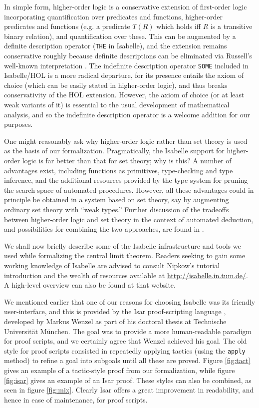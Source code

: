 \documentclass[leqno]{article}
\theoremstyle{definition}
\begin{document}
In simple form, higher-order logic is a conservative extension of first-order logic incorporating quantification over predicates and functions, higher-order predicates and functions (e.g. a predicate $T(R)$ which holds iff $R$ is a transitive binary relation), and quantification over these. This can be augmented by a definite description operator (\texttt{THE} in Isabelle), and the extension remains conservative roughly because definite descriptions can be eliminated via Russell's well-known interpretation \cite{russell-knowledge-acquaintance-description}. The indefinite description operator \texttt{SOME} included in Isabelle/HOL is a more radical departure, for its presence entails the axiom of choice (which can be easily stated in higher-order logic), and thus breaks conservativity of the HOL extension. However, the axiom of choice (or at least weak variants of it) is essential to the usual development of mathematical analysis, and so the indefinite description operator is a welcome addition for our purposes.

One might reasonably ask why higher-order logic rather than set theory is used as the basis of our formalization. Pragmatically, the Isabelle support for higher-order logic is far better than that for set theory; why is this? A number of advantages exist, including functions as primitives, type-checking and type inference, and the additional resources provided by the type system for pruning the search space of automated procedures. However, all these advantages could in principle be obtained in a system based on set theory, say by augmenting ordinary set theory with ``weak types.'' Further discussion of the tradeoffs between higher-order logic and set theory in the context of automated deduction, and possibilities for combining the two approaches, are found in \cite{gordon-hol-set}.

We shall now briefly describe some of the Isabelle infrastructure and tools we used while formalizing the central limit theorem. Readers seeking to gain some working knowledge of Isabelle are advised to consult Nipkow's tutorial introduction \cite{nipkow-prog-prove} and the wealth of resources available at \linebreak \url{http://isabelle.in.tum.de/}. A high-level overview can also be found at that website.

We mentioned earlier that one of our reasons for choosing Isabelle was its friendly user-interface, and this is provided by the Isar proof-scripting language \cite{wenzel-isar}, developed by Markus Wenzel as part of his doctoral thesis at Technische Universit\"at M\"unchen. The goal was to provide a more human-readable paradigm for proof scripts, and we certainly agree that Wenzel achieved his goal. The old style for proof scripts consisted in repeatedly applying tactics (using the \texttt{apply} method) to refine a goal into subgoals until all these are proved. Figure \ref{fig:tact} gives an example of a tactic-style proof from our formalization, while figure \ref{fig:isar} gives an example of an Isar proof. These styles can also be combined, as seen in figure \ref{fig:mix}. Clearly Isar offers a great improvement in readability, and hence in ease of maintenance, for proof scripts.
\end{document}
